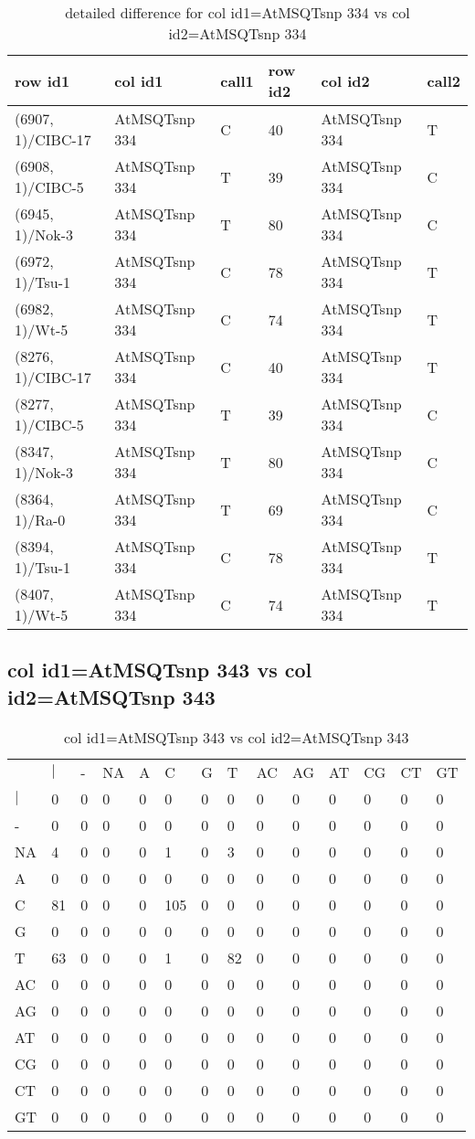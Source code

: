 \begin{center}
\begin{longtable}{|l|l|l|l|l|l|}
\caption{detailed difference for col id1=AtMSQTsnp 334 vs col id2=AtMSQTsnp 334} \label{table_dm863}\\
\hline
row id1&col id1&call1&row id2&col id2&call2\\
\hline
(6907, 1)/CIBC-17&AtMSQTsnp 334&C&40&AtMSQTsnp 334&T\\
(6908, 1)/CIBC-5&AtMSQTsnp 334&T&39&AtMSQTsnp 334&C\\
(6945, 1)/Nok-3&AtMSQTsnp 334&T&80&AtMSQTsnp 334&C\\
(6972, 1)/Tsu-1&AtMSQTsnp 334&C&78&AtMSQTsnp 334&T\\
(6982, 1)/Wt-5&AtMSQTsnp 334&C&74&AtMSQTsnp 334&T\\
(8276, 1)/CIBC-17&AtMSQTsnp 334&C&40&AtMSQTsnp 334&T\\
(8277, 1)/CIBC-5&AtMSQTsnp 334&T&39&AtMSQTsnp 334&C\\
(8347, 1)/Nok-3&AtMSQTsnp 334&T&80&AtMSQTsnp 334&C\\
(8364, 1)/Ra-0&AtMSQTsnp 334&T&69&AtMSQTsnp 334&C\\
(8394, 1)/Tsu-1&AtMSQTsnp 334&C&78&AtMSQTsnp 334&T\\
(8407, 1)/Wt-5&AtMSQTsnp 334&C&74&AtMSQTsnp 334&T\\
\hline
\end{longtable}
\end{center}

\subsection{col id1=AtMSQTsnp 343 vs col id2=AtMSQTsnp 343}
\begin{center}
\begin{longtable}{|l|l|l|l|l|l|l|l|l|l|l|l|l|l|}
\caption{col id1=AtMSQTsnp 343 vs col id2=AtMSQTsnp 343} \label{table_dm864}\\
\hline
\\
\hline
&$|$&-&NA&A&C&G&T&AC&AG&AT&CG&CT&GT\\
$|$&0&0&0&0&0&0&0&0&0&0&0&0&0\\
-&0&0&0&0&0&0&0&0&0&0&0&0&0\\
NA&4&0&0&0&1&0&3&0&0&0&0&0&0\\
A&0&0&0&0&0&0&0&0&0&0&0&0&0\\
C&81&0&0&0&105&0&0&0&0&0&0&0&0\\
G&0&0&0&0&0&0&0&0&0&0&0&0&0\\
T&63&0&0&0&1&0&82&0&0&0&0&0&0\\
AC&0&0&0&0&0&0&0&0&0&0&0&0&0\\
AG&0&0&0&0&0&0&0&0&0&0&0&0&0\\
AT&0&0&0&0&0&0&0&0&0&0&0&0&0\\
CG&0&0&0&0&0&0&0&0&0&0&0&0&0\\
CT&0&0&0&0&0&0&0&0&0&0&0&0&0\\
GT&0&0&0&0&0&0&0&0&0&0&0&0&0\\
\hline
\end{longtable}
\end{center}

